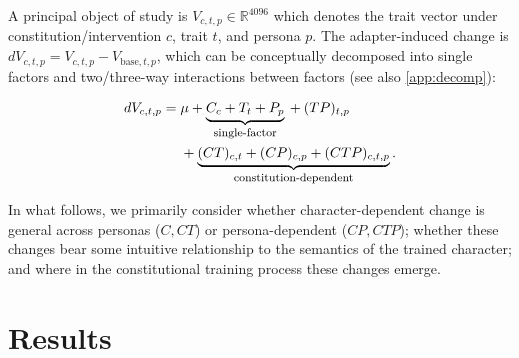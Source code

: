 \documentclass[11pt]{article}
\begin{document}
A principal object of study is $V_{c,t,p}\in\mathbb{R}^{4096}$ which denotes the trait vector under constitution/intervention $c$, trait $t$, and persona $p$. The adapter-induced change is $dV_{c,t,p}=V_{c,t,p}-V_{\mathrm{base},t,p}$, which can be conceptually decomposed into single factors and two/three-way interactions between factors (see also \ref{app:decomp}):

\begin{equation}
\label{eq:decomp}
\begin{aligned}
dV_{c,t,p}
={}&
\mu
+ \underbrace{C_c + T_t + P_p}_{\text{\footnotesize single-factor}}{}
+ (TP)_{t,p}\\
&+ \underbrace{(CT)_{c,t} + (CP)_{c,p} + (CTP)_{c,t,p}}_{\text{\footnotesize constitution-dependent}}.
\end{aligned}
\end{equation}

In what follows, we primarily consider whether character-dependent change is general across personas (\(C,CT\)) or persona-dependent (\(CP,CTP\)); whether these changes bear some intuitive relationship to the semantics of the trained character; and where in the constitutional training process these changes emerge.

\section{Results}
\end{document}
